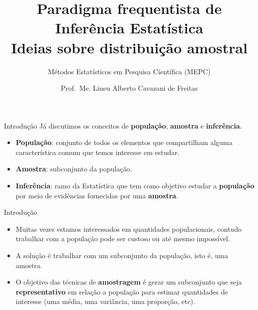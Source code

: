 \documentclass[
  ignorenonframetext,
  serif,
  professionalfont,
  usenames,
  dvipsnames,
  aspectratio = 169]{beamer}
\title{\textbf{Paradigma frequentista de Inferência Estatística}\\
Ideias sobre distribuição amostral}
\subtitle{\hfill\break
Métodos Estatísticos em Pesquisa Científica (MEPC)}
\author{Prof.~Me. Lineu Alberto Cavazani de Freitas}
\date{}
\institute{\hfill\break
Departamento de Estatística\\
Laboratório de Estatística e Geoinformação}
\providecommand{\tightlist}{%
  \setlength{\itemsep}{0pt}\setlength{\parskip}{0pt}}
\renewcommand{\tightlist}{%
  \setlength{\itemsep}{0\baselineskip}
  \setlength{\parskip}{0.25\baselineskip}
}
\begin{document}
\frame{\titlepage}

\begin{frame}{Introdução}
\protect\hypertarget{introduuxe7uxe3o}{}
Já discutimos os conceitos de \textbf{população}, \textbf{amostra} e
\textbf{inferência}.

\vspace{0.3cm}

\begin{itemize}
\tightlist
\item
  \textbf{População}: conjunto de todos os elementos que compartilham
  alguma característica comum que temos interesse em estudar.
\end{itemize}

\vspace{0.3cm}

\begin{itemize}
\tightlist
\item
  \textbf{Amostra}: subconjunto da população.
\end{itemize}

\vspace{0.3cm}

\begin{itemize}
\tightlist
\item
  \textbf{Inferência}: ramo da Estatística que tem como objetivo estudar
  a \textbf{população} por meio de evidências fornecidas por uma
  \textbf{amostra}.
\end{itemize}
\end{frame}

\begin{frame}{Introdução}
\protect\hypertarget{introduuxe7uxe3o-1}{}
\begin{itemize}
\tightlist
\item
  Muitas vezes estamos interessados em quantidades populacionais,
  contudo trabalhar com a população pode ser custoso ou até mesmo
  impossível.
\end{itemize}

\vspace{0.3cm}

\begin{itemize}
\tightlist
\item
  A solução é trabalhar com um subconjunto da população, isto é, uma
  amostra.
\end{itemize}

\vspace{0.3cm}

\begin{itemize}
\tightlist
\item
  O objetivo das técnicas de \textbf{amostragem} é gerar um subconjunto
  que seja \textbf{representativo} em relação a população para estimar
  quantidades de interesse (uma média, uma variância, uma proporção,
  etc).
\end{itemize}
\end{frame}
\end{document}

